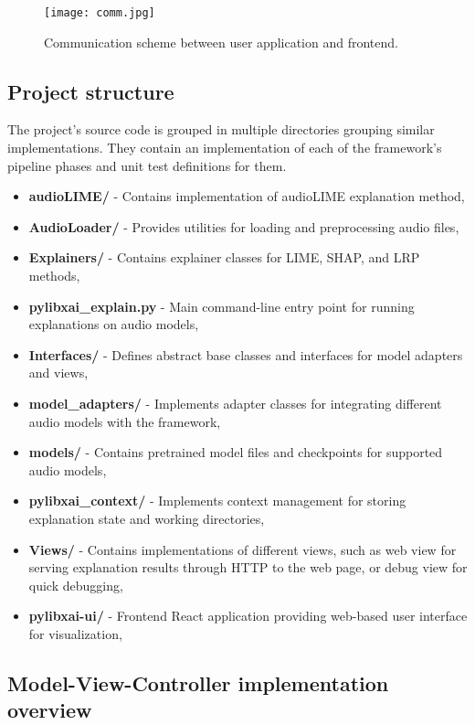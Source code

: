 \documentclass[
    bindingoffset=5mm,  %
    footnoteindent=3mm, %
    hyphenation=true    %
]{src/wut-thesis}
\begin{document}
\begin{figure}[h!] %
    \centering
    \texttt{[image: comm.jpg]}
    \caption{Communication scheme between user application and frontend.}
    \label{fig:CommunicationArchitecture}
\end{figure}

\subsection{Project structure}

    The project’s source code is grouped in multiple directories grouping similar implementations. They contain an implementation of each of the framework’s pipeline phases
    and unit test definitions for them.

\begin{itemize}[itemsep=1\baselineskip]
	\item \textbf{audioLIME/} - Contains implementation of audioLIME explanation method,
	\item \textbf{AudioLoader/} - Provides utilities for loading and preprocessing audio files,
	\item \textbf{Explainers/} - Contains explainer classes for LIME, SHAP, and LRP methods,
	\item \textbf{pylibxai\_explain.py} - Main command-line entry point for running explanations on audio models,
	\item \textbf{Interfaces/} - Defines abstract base classes and interfaces for model adapters and views,
	\item \textbf{model\_adapters/} - Implements adapter classes for integrating different audio models with the framework,
	\item \textbf{models/} - Contains pretrained model files and checkpoints for supported audio models,
	\item \textbf{pylibxai\_context/} - Implements context management for storing explanation state and working directories,
	\item \textbf{Views/} - Contains implementations of different views, such as web view for serving explanation results through HTTP to the web page, or debug view for quick debugging,
	\item \textbf{pylibxai-ui/} - Frontend React application providing web-based user interface for visualization,
\end{itemize}

\subsection{Model-View-Controller implementation overview}
\end{document}
